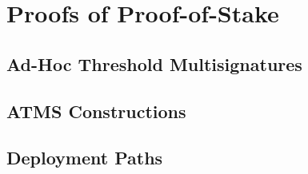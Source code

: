 \chapter{Proofs of Proof-of-Stake}\label{chapter:stake}

\section{Ad-Hoc Threshold Multisignatures}
\section{ATMS Constructions}
\section{Deployment Paths}
